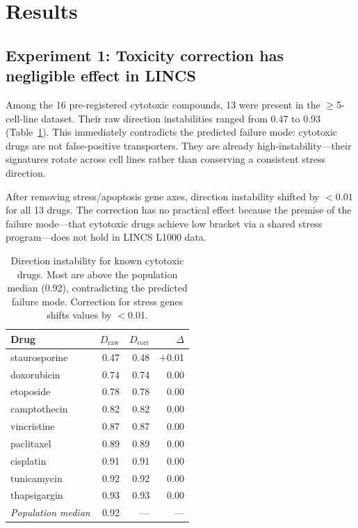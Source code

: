 \documentclass{article}
\begin{document}
\section{Results}

\subsection{Experiment 1: Toxicity correction has negligible effect in LINCS}

Among the 16 pre-registered cytotoxic compounds, 13 were present in the
$\geq$5-cell-line dataset. Their raw direction instabilities ranged from
0.47 to 0.93 (Table~\ref{tab:toxic}). This immediately contradicts the
predicted failure mode: cytotoxic drugs are not false-positive transporters.
They are already high-instability---their signatures rotate across cell lines
rather than conserving a consistent stress direction.

After removing stress/apoptosis gene axes, direction instability shifted by
$<0.01$ for all 13 drugs. The correction has no practical effect because the
premise of the failure mode---that cytotoxic drugs achieve low bracket via
a shared stress program---does not hold in LINCS L1000 data.

\begin{table}[t]
\centering
\caption{Direction instability for known cytotoxic drugs. Most are above the
population median (0.92), contradicting the predicted failure mode.
Correction for stress genes shifts values by $<$0.01.}
\label{tab:toxic}
\small
\begin{tabular}{lrrr}
\toprule
Drug & $D_{\text{raw}}$ & $D_{\text{corr}}$ & $\Delta$ \\
\midrule
staurosporine & 0.47 & 0.48 & $+$0.01 \\
doxorubicin & 0.74 & 0.74 & 0.00 \\
etoposide & 0.78 & 0.78 & 0.00 \\
camptothecin & 0.82 & 0.82 & 0.00 \\
vincristine & 0.87 & 0.87 & 0.00 \\
paclitaxel & 0.89 & 0.89 & 0.00 \\
cisplatin & 0.91 & 0.91 & 0.00 \\
tunicamycin & 0.92 & 0.92 & 0.00 \\
thapsigargin & 0.93 & 0.93 & 0.00 \\
\midrule
\emph{Population median} & 0.92 & --- & --- \\
\bottomrule
\end{tabular}
\end{table}
\end{document}
